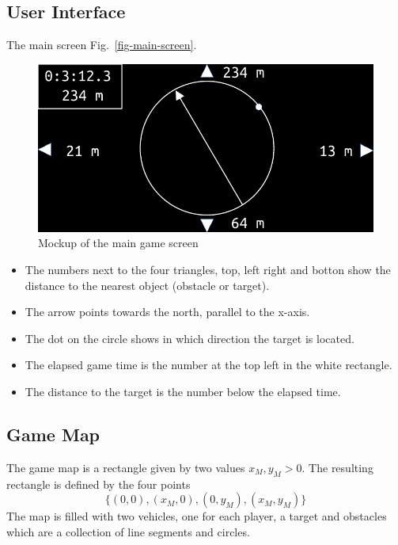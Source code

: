 \documentclass[11pt]{article}
\newcommand{\figref}[1]{Fig.~\eqref{#1}}
\begin{document}
\subsection{User Interface}
\label{sec-user-interface}
The main screen \figref{fig-main-screen}.
\begin{figure}
    \includegraphics[width=\textwidth]{screen.pdf}
\caption{Mockup of the main game screen}\label{fig-main-screen}
\end{figure}
\begin{itemize}
    \item The numbers next to the four triangles, top, left right and botton
        show the distance to the nearest object (obstacle or target).
    \item The arrow points towards the north, parallel to the x-axis.
    \item The dot on the circle shows in which direction the target is
        located.
    \item The elapsed game time is the number at the top left in the white
        rectangle.
    \item The distance to the target is the number below the elapsed time.
\end{itemize}

\subsection{Game Map}
\label{sec-game-map}
The game map is a rectangle given by two values $x_M, y_M > 0$. The resulting
rectangle is defined by the four points
\begin{equation*}
    \{(0,0), (x_M, 0), (0, y_M), (x_M, y_M)\}
\end{equation*}
The map is filled with two vehicles, one for each player, a target and
obstacles which are a collection of line segments and circles.
\end{document}
